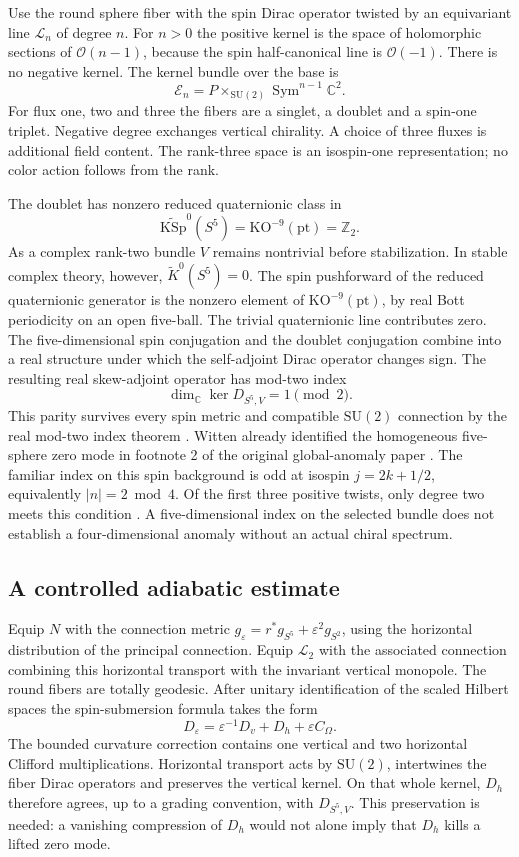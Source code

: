 \documentclass[11pt,oneside]{article}
\newcommand{\C}{\mathbb C}
\newcommand{\Z}{\mathbb Z}
\newcommand{\SU}{\mathrm{SU}}
\newcommand{\KO}{\mathrm{KO}}
\newcommand{\KSp}{\mathrm{KSp}}
\newcommand{\OO}{\mathcal O}
\newcommand{\Sym}{\operatorname{Sym}}
\begin{document}
Use the round sphere fiber with the spin Dirac operator twisted by an equivariant line \(\mathcal L_n\) of degree \(n\). For \(n>0\) the positive kernel is the space of holomorphic sections of \(\OO(n-1)\), because the spin half-canonical line is \(\OO(-1)\). There is no negative kernel. The kernel bundle over the base is
\[
 \mathcal E_n=P\times_{\SU(2)}\Sym^{n-1}\C^2 .
\]
For flux one, two and three the fibers are a singlet, a doublet and a spin-one triplet. Negative degree exchanges vertical chirality. A choice of three fluxes is additional field content. The rank-three space is an isospin-one representation; no color action follows from the rank.

The doublet has nonzero reduced quaternionic class in
\[
 \widetilde{\KSp}^{0}(S^5)=\KO^{-9}(\mathrm{pt})=\Z_2.
\]
As a complex rank-two bundle \(V\) remains nontrivial before stabilization. In stable complex theory, however, \(\widetilde K^0(S^5)=0\). The spin pushforward of the reduced quaternionic generator is the nonzero element of \(\KO^{-9}(\mathrm{pt})\), by real Bott periodicity on an open five-ball. The trivial quaternionic line contributes zero. The five-dimensional spin conjugation and the doublet conjugation combine into a real structure under which the self-adjoint Dirac operator changes sign. The resulting real skew-adjoint operator has mod-two index
\[
 \dim_{\C}\ker D_{S^5,V}=1\pmod 2 .
\]
This parity survives every spin metric and compatible \(\SU(2)\) connection by the real mod-two index theorem \cite{atiyahsinger}. Witten already identified the homogeneous five-sphere zero mode in footnote 2 of the original global-anomaly paper \cite{witten}. The familiar index on this spin background is odd at isospin \(j=2k+1/2\), equivalently \(|n|=2\bmod4\). Of the first three positive twists, only degree two meets this condition \cite{www}. A five-dimensional index on the selected bundle does not establish a four-dimensional anomaly without an actual chiral spectrum.

\subsection*{A controlled adiabatic estimate}
Equip \(N\) with the connection metric \(g_\varepsilon=r^*g_{S^5}+\varepsilon^2g_{S^2}\), using the horizontal distribution of the principal connection. Equip \(\mathcal L_2\) with the associated connection combining this horizontal transport with the invariant vertical monopole. The round fibers are totally geodesic. After unitary identification of the scaled Hilbert spaces the spin-submersion formula takes the form \cite{kaad}
\[
 D_\varepsilon=\varepsilon^{-1}D_v+D_h+\varepsilon C_\Omega .
\]
The bounded curvature correction contains one vertical and two horizontal Clifford multiplications. Horizontal transport acts by \(\SU(2)\), intertwines the fiber Dirac operators and preserves the vertical kernel. On that whole kernel, \(D_h\) therefore agrees, up to a grading convention, with \(D_{S^5,V}\). This preservation is needed: a vanishing compression of \(D_h\) would not alone imply that \(D_h\) kills a lifted zero mode.
\end{document}
